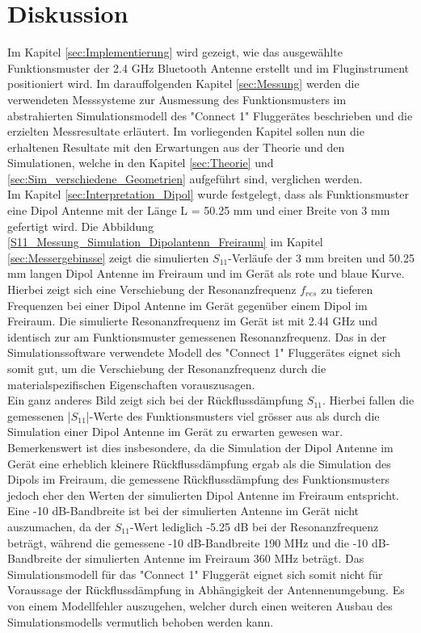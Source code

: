 \chapter{Diskussion}
Im Kapitel \ref{sec:Implementierung} wird gezeigt, wie das ausgewählte Funktionsmuster der 2.4 GHz Bluetooth Antenne erstellt und im Fluginstrument positioniert wird. Im darauffolgenden Kapitel \ref{sec:Messung} werden die verwendeten Messsysteme zur Ausmessung des Funktionsmusters im abstrahierten Simulationsmodell des "Connect 1" Fluggerätes beschrieben und die erzielten Messresultate erläutert. Im vorliegenden Kapitel sollen nun die erhaltenen Resultate mit den Erwartungen aus der Theorie und den Simulationen, welche in den Kapitel \ref{sec:Theorie}
 und \ref{sec:Sim_verschiedene_Geometrien}
 aufgeführt sind, verglichen werden.\\
Im Kapitel \ref{sec:Interpretation_Dipol} wurde festgelegt, dass als Funktionsmuster eine Dipol Antenne mit der Länge L = 50.25 mm und einer Breite von 3 mm gefertigt wird. Die Abbildung \ref{S11_Messung_Simulation_Dipolantenn_Freiraum} im Kapitel \ref{sec:Messergebinsse} zeigt die simulierten $S_{11}$-Verläufe der 3 mm breiten und 50.25 mm langen Dipol Antenne im Freiraum und im Gerät als rote und blaue Kurve. Hierbei zeigt sich eine Verschiebung der Resonanzfrequenz $f_{res}$ zu tieferen Frequenzen bei einer Dipol Antenne im Gerät gegenüber einem Dipol im Freiraum. Die simulierte Resonanzfrequenz im Gerät ist mit 2.44 GHz und identisch zur am Funktionsmuster gemessenen Resonanzfrequenz. Das in der Simulationssoftware verwendete Modell des "Connect 1" Fluggerätes eignet sich somit gut, um die Verschiebung der Resonanzfrequenz durch die materialspezifischen Eigenschaften vorauszusagen.\\
Ein ganz anderes Bild zeigt sich bei der Rückflussdämpfung $S_{11}$. Hierbei fallen die gemessenen |$S_{11}$|-Werte des Funktionsmusters viel grösser aus als durch die Simulation einer Dipol Antenne im Gerät zu erwarten gewesen war. Bemerkenswert ist dies insbesondere, da die Simulation der Dipol Antenne im Gerät eine erheblich kleinere Rückflussdämpfung ergab als die Simulation des Dipols im Freiraum, die gemessene Rückflussdämpfung des Funktionsmusters jedoch eher den Werten der simulierten Dipol Antenne im Freiraum entspricht. Eine -10 dB-Bandbreite ist bei der simulierten Antenne im Gerät nicht auszumachen, da der $S_{11}$-Wert lediglich -5.25 dB bei der Resonanzfrequenz beträgt, während die gemessene -10 dB-Bandbreite 190 MHz und die -10 dB-Bandbreite der simulierten Antenne im Freiraum 360 MHz beträgt. Das Simulationsmodell für das "Connect 1" Fluggerät eignet sich somit nicht für Voraussage der Rückflussdämpfung in Abhängigkeit der Antennenumgebung. Es von einem Modellfehler auszugehen, welcher durch einen weiteren Ausbau des Simulationsmodells vermutlich behoben werden kann.\\
